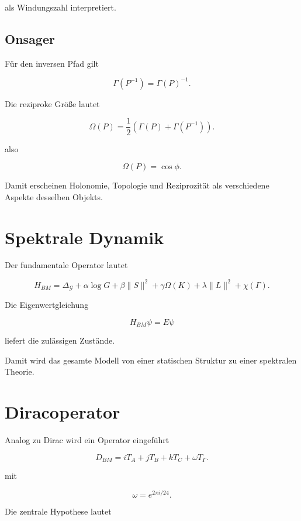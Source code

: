 \documentclass[11pt,a4paper]{article}
\begin{document}
	als Windungszahl interpretiert.
	
	\subsection{Onsager}
	
	Für den inversen Pfad gilt
	
	\[
	\Gamma(P^{-1})
	=
	\Gamma(P)^{-1}.
	\]
	
	Die reziproke Größe lautet
	
	\[
	\Omega(P)
	=
	\frac12
	\left(
	\Gamma(P)
	+
	\Gamma(P^{-1})
	\right).
	\]
	
	also
	
	\[
	\Omega(P)
	=
	\cos\phi.
	\]
	
	Damit erscheinen Holonomie,
	Topologie und Reziprozität
	als verschiedene Aspekte desselben Objekts.
	
	\section{Spektrale Dynamik}
	
	Der fundamentale Operator lautet
	
	\[
	H_{BM}
	=
	\Delta_{\mathcal G}
	+
	\alpha \log G
	+
	\beta \|S\|^2
	+
	\gamma \Omega(K)
	+
	\lambda \|L\|^2
	+
	\chi(\Gamma).
	\]
	
	Die Eigenwertgleichung
	
	\[
	H_{BM}\psi
	=
	E\psi
	\]
	
	liefert die zulässigen Zustände.
	
	Damit wird das gesamte Modell
	von einer statischen Struktur
	zu einer spektralen Theorie.
	
	\section{Diracoperator}
	
	Analog zu Dirac wird ein Operator eingeführt
	
	\[
	D_{BM}
	=
	iT_A
	+
	jT_B
	+
	kT_C
	+
	\omega T_\Gamma.
	\]
	
	mit
	
	\[
	\omega
	=
	e^{2\pi i/24}.
	\]
	
	Die zentrale Hypothese lautet
	
\end{document}
